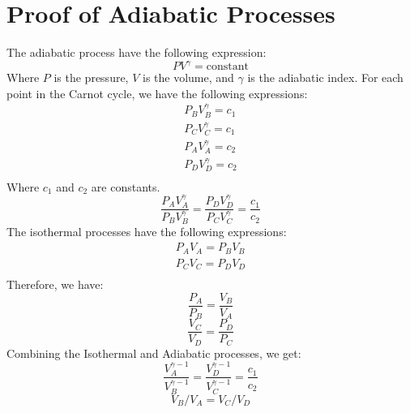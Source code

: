 \documentclass[11pt]{article}
\begin{document}
\section{Proof of Adiabatic Processes}\label{sec:proof-of-adiabatic-processes}
    The adiabatic process have the following expression:
    \[PV^\gamma = \text{constant}\]
    Where $P$ is the pressure, $V$ is the volume, and $\gamma$ is the adiabatic index.
    For each point in the Carnot cycle, we have the following expressions:
    \begin{align*}
        P_B V_B^\gamma = c_1\\
        P_C V_C^\gamma = c_1\\
        P_A V_A^\gamma = c_2\\
        P_D V_D^\gamma = c_2\\
    \end{align*}
    Where $c_1$ and $c_2$ are constants.
    \[
        \frac{P_A V_A^\gamma}{P_B V_B^\gamma} = \frac{P_D V_D^\gamma}{P_C V_C^\gamma} = \frac{c_1}{c_2}
    \]
    The isothermal processes have the following expressions:
    \begin{align*}
        P_A V_A = P_B V_B\\
        P_C V_C = P_D V_D\\
    \end{align*}
    Therefore, we have:
    \[
        \frac{P_A}{P_B} = \frac{V_B}{V_A}
    \]
    \[\frac{V_C}{V_D} = \frac{P_D}{P_C}\]
    Combining the Isothermal and Adiabatic processes, we get:
\[
    \frac{V_A^{\gamma-1}}{V_B^{\gamma-1}} = \frac{ V_D^{\gamma-1}}{ V_C^{\gamma-1}}= \frac{c_1}{c_2}
\]
\[V_B/V_A = V_C/V_D\]
\end{document}

